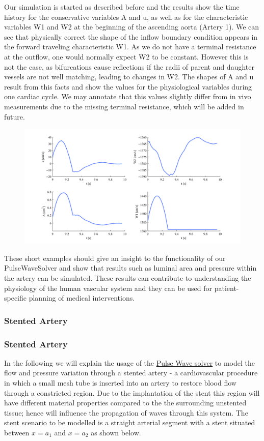 Our simulation is started as described before and the results show the time
history for the conservative variables A and u, as well as for the
characteristic variables W1 and W2 at the beginning of the ascending aorta
(Artery 1). We can see that physically correct the shape of the inflow boundary
condition appears in the forward traveling characteristic W1. As we do not have
a terminal resistance at the outflow, one would normally expect W2 to be
constant. However this is not the case, as bifurcations cause reflections if the
radii of parent and daughter vessels are not well matching, leading to changes
in W2. The shapes of A and u result from this facts and show the values for the
physiological variables during one cardiac cycle. We may annotate that this
values slightly differ from in vivo measurements due to the missing terminal
resistance, which will be added in future.

\begin{figure}
	\includegraphics[width=\linewidth]{img/Network_Results.png}
\end{figure}

These short examples should give an insight to the functionality of our
PulseWaveSolver and show that results such as luminal area and pressure within
the artery can be simulated. These results can contribute to understanding the
physiology of the human vascular system and they can be used for
patient-specific planning of medical interventions.



\subsubsection{Stented Artery}
\subsubsection{Stented Artery}
In the following we will explain the usage of the  \hyperref[PulseWaveSolver]{Pulse Wave solver} to model the flow and pressure variation through a stented artery - a cardiovascular procedure in which a small mesh tube is inserted into an artery to restore blood flow through a constricted region. Due to the implantation of the stent this region will have different material properties compared to the the surrounding unstented tissue; hence will influence the propagation of waves through this system. The stent scenario to be modelled is a straight arterial segment with a stent situated between $x=a_{1}$ and $x=a_{2}$ as shown below.

